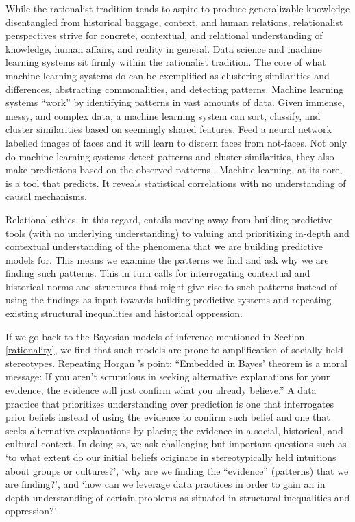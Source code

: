 While the rationalist tradition tends to aspire to produce generalizable knowledge disentangled from historical baggage, context, and human relations, relationalist perspectives strive for concrete, contextual, and relational understanding of knowledge, human affairs, and reality in general. Data science and machine learning systems sit firmly within the rationalist tradition. The core of what machine learning systems do can be exemplified as clustering similarities and differences, abstracting commonalities, and detecting patterns. Machine learning systems ``work'' by identifying patterns in vast amounts of data. Given immense, messy, and complex data, a machine learning system can sort, classify, and cluster similarities based on seemingly shared features. Feed a neural network labelled images of faces and it will learn to discern faces from not-faces. Not only do machine learning systems detect patterns and cluster similarities, they also make predictions based on the observed patterns \cite{o2013doing}. Machine learning, at its core, is a tool that predicts. It reveals statistical correlations with no understanding of causal mechanisms. 

Relational ethics, in this regard, entails moving away from building predictive tools (with no underlying understanding) to valuing and prioritizing in-depth and contextual understanding of the phenomena that we are building predictive models for. This means we examine the patterns we find and ask why we are finding such patterns. This in turn calls for interrogating contextual and historical norms and structures that might give rise to such patterns instead of using the findings as input towards building predictive systems and repeating existing structural inequalities and historical oppression. 

If we go back to the Bayesian models of inference mentioned in Section \ref{rationality}, we find that such models are prone to amplification of socially held stereotypes. Repeating Horgan \cite{Bayes2016}'s point: ``Embedded in Bayes’ theorem is a moral message: If you aren’t scrupulous in seeking alternative explanations for your evidence, the evidence will just confirm what you already believe.'' A data practice that prioritizes understanding over prediction is one that interrogates prior beliefs instead of using the evidence to confirm such belief and one that seeks alternative explanations by placing the evidence in a social, historical, and cultural context. In doing so, we ask challenging but important questions such as `to what extent do our initial beliefs originate in stereotypically held intuitions about groups or cultures?', `why are we finding the ``evidence'' (patterns) that we are finding?', and `how can we leverage data practices in order to gain an in depth understanding of certain problems as situated in structural inequalities and oppression?' 


